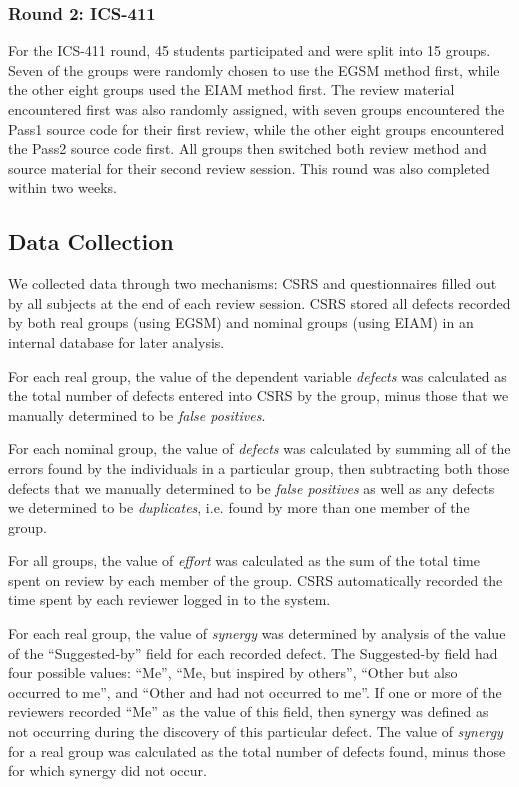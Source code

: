 \subsubsection{Round 2: ICS-411}

For the ICS-411 round, 45 students participated and were split into 15
groups. Seven of the groups were randomly chosen to use the EGSM method
first, while the other eight groups used the EIAM method first.  The 
review material encountered first was also randomly assigned, with seven
groups encountered the Pass1 source code for their first review, while the
other eight groups encountered the Pass2 source code first.  All groups
then switched both review method and source material for their second
review session. This round was also completed within two weeks. 

\subsection{Data Collection}

We collected data through two mechanisms: CSRS and questionnaires filled
out by all subjects at the end of each review session.  CSRS stored
all defects recorded by both real groups (using EGSM) and nominal groups
(using EIAM) in an internal database for later analysis.

For each real group, the value of the dependent variable {\em defects} was
calculated as the total number of defects entered into CSRS by the group,
minus those that we manually determined to be {\em false positives}.

For each nominal group, the value of {\em defects} was calculated by summing
all of the errors found by the individuals in a particular group, then
subtracting both those defects that we manually determined to be {\em false
  positives} as well as any defects we determined to be {\em duplicates},
i.e. found by more than one member of the group. 

For all groups, the value of {\em effort} was calculated
as the sum of the total time spent on review by each member of the group. 
CSRS automatically recorded the time spent by each reviewer logged in to
the system. 

For each real group, the value of {\em synergy} was determined by analysis
of the value of the ``Suggested-by'' field for each recorded defect. The
Suggested-by field had four possible values: ``Me'', ``Me, but inspired by
others'', ``Other but also occurred to me'', and ``Other and had not
occurred to me''.  If one or more of the reviewers recorded ``Me'' as the
value of this field, then synergy was defined as not occurring during the
discovery of this particular defect. The value of {\em synergy} for 
a real group was calculated as the total number of defects found, minus
those for which synergy did not occur. 

